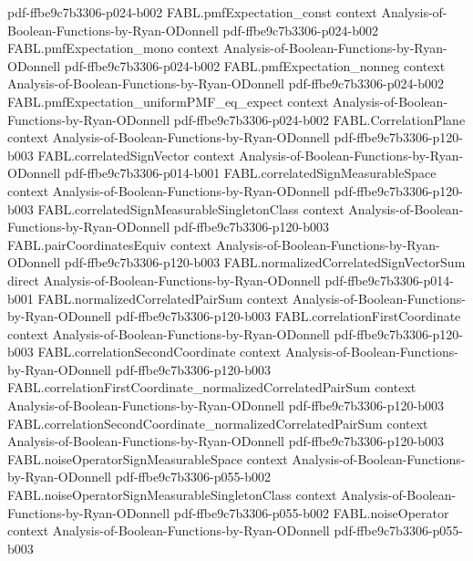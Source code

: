 \begin{theorem}
  {pdf-ffbe9c7b3306-p024-b002}
\proofstep
  {FABL.pmfExpectation_const}
  {context}
  {Analysis-of-Boolean-Functions-by-Ryan-ODonnell}
  {pdf-ffbe9c7b3306-p024-b002}
\proofstep
  {FABL.pmfExpectation_mono}
  {context}
  {Analysis-of-Boolean-Functions-by-Ryan-ODonnell}
  {pdf-ffbe9c7b3306-p024-b002}
\proofstep
  {FABL.pmfExpectation_nonneg}
  {context}
  {Analysis-of-Boolean-Functions-by-Ryan-ODonnell}
  {pdf-ffbe9c7b3306-p024-b002}
\proofstep
  {FABL.pmfExpectation_uniformPMF_eq_expect}
  {context}
  {Analysis-of-Boolean-Functions-by-Ryan-ODonnell}
  {pdf-ffbe9c7b3306-p024-b002}
\proofstep
  {FABL.CorrelationPlane}
  {context}
  {Analysis-of-Boolean-Functions-by-Ryan-ODonnell}
  {pdf-ffbe9c7b3306-p120-b003}
\proofstep
  {FABL.correlatedSignVector}
  {context}
  {Analysis-of-Boolean-Functions-by-Ryan-ODonnell}
  {pdf-ffbe9c7b3306-p014-b001}
\proofstep
  {FABL.correlatedSignMeasurableSpace}
  {context}
  {Analysis-of-Boolean-Functions-by-Ryan-ODonnell}
  {pdf-ffbe9c7b3306-p120-b003}
\proofstep
  {FABL.correlatedSignMeasurableSingletonClass}
  {context}
  {Analysis-of-Boolean-Functions-by-Ryan-ODonnell}
  {pdf-ffbe9c7b3306-p120-b003}
\proofstep
  {FABL.pairCoordinatesEquiv}
  {context}
  {Analysis-of-Boolean-Functions-by-Ryan-ODonnell}
  {pdf-ffbe9c7b3306-p120-b003}
\proofstep
  {FABL.normalizedCorrelatedSignVectorSum}
  {direct}
  {Analysis-of-Boolean-Functions-by-Ryan-ODonnell}
  {pdf-ffbe9c7b3306-p014-b001}
\proofstep
  {FABL.normalizedCorrelatedPairSum}
  {context}
  {Analysis-of-Boolean-Functions-by-Ryan-ODonnell}
  {pdf-ffbe9c7b3306-p120-b003}
\proofstep
  {FABL.correlationFirstCoordinate}
  {context}
  {Analysis-of-Boolean-Functions-by-Ryan-ODonnell}
  {pdf-ffbe9c7b3306-p120-b003}
\proofstep
  {FABL.correlationSecondCoordinate}
  {context}
  {Analysis-of-Boolean-Functions-by-Ryan-ODonnell}
  {pdf-ffbe9c7b3306-p120-b003}
\proofstep
  {FABL.correlationFirstCoordinate_normalizedCorrelatedPairSum}
  {context}
  {Analysis-of-Boolean-Functions-by-Ryan-ODonnell}
  {pdf-ffbe9c7b3306-p120-b003}
\proofstep
  {FABL.correlationSecondCoordinate_normalizedCorrelatedPairSum}
  {context}
  {Analysis-of-Boolean-Functions-by-Ryan-ODonnell}
  {pdf-ffbe9c7b3306-p120-b003}
\proofstep
  {FABL.noiseOperatorSignMeasurableSpace}
  {context}
  {Analysis-of-Boolean-Functions-by-Ryan-ODonnell}
  {pdf-ffbe9c7b3306-p055-b002}
\proofstep
  {FABL.noiseOperatorSignMeasurableSingletonClass}
  {context}
  {Analysis-of-Boolean-Functions-by-Ryan-ODonnell}
  {pdf-ffbe9c7b3306-p055-b002}
\proofstep
  {FABL.noiseOperator}
  {context}
  {Analysis-of-Boolean-Functions-by-Ryan-ODonnell}
  {pdf-ffbe9c7b3306-p055-b003}

\end{theorem}
